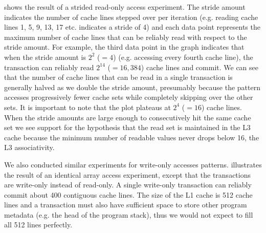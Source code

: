  shows the result of a strided read-only
access experiment. The stride amount indicates 
the number of cache lines stepped over per
iteration (e.g. reading cache lines 1, 5, 9, 13, 17 etc. 
indicates a stride of 4) and each data point 
represents the maximum number of cache
lines that can be reliably read with respect 
to the stride amount. For example,
the third data point in the graph indicates 
that when the stride amount is
$2^2$ ($=4$) (e.g. accessing every fourth cache line), 
the transaction can reliably read
$2^{14}$ ($=16,384$) cache lines and commit. 
We can see that the number of cache lines that can be 
read in a single transaction is generally
halved as we double the stride amount, presumably 
because the pattern
accesses progressively fewer cache sets while 
completely skipping over the other sets.
It is important to note that the plot plateaus 
at $2^4$ ($=16$) cache lines.
When the stride amounts are large enough to consecutively
hit the same cache set we see support for 
the hypothesis that the read set is
maintained in the {L3} cache because the minimum number
of readable values never drops below 16, 
the L3 associativity.


We also conducted similar experiments for write-only accesses
patterns.   illustrates 
the result of an
identical array access experiment, except that the 
transactions are write-only
instead of read-only. A single write-only transaction 
can reliably commit about 400 contiguous cache lines. The
size of the {L1} cache is 512 cache lines and a transaction must also
have sufficient space to store other program metadata (e.g. the
head of the program stack), thus we would not expect to fill
all 512 lines perfectly.

